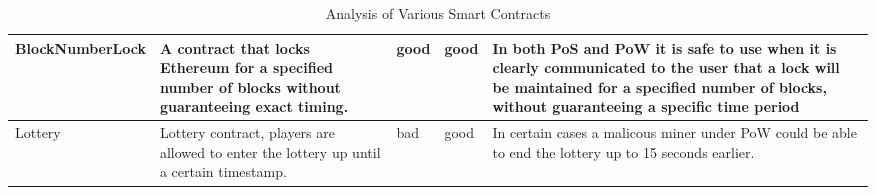 \begin{table}[H]
\begin{tabularx}{\textwidth}{L{3.5cm}L{3.5cm}C{0.5cm}C{0.5cm}X}
BlockNumberLock       & A contract that locks Ethereum for a specified number of blocks without guaranteeing exact timing.                                      & good         & good         & In both PoS and PoW it is safe to use when it is clearly communicated to the user that a lock will be maintained for a specified number of blocks, without guaranteeing a specific time period \\ \hline
Lottery               & Lottery contract, players are allowed to enter the lottery up until a certain timestamp.                                                               & bad         & good         & In certain cases a malicous miner under PoW could be able to end the lottery up to 15 seconds earlier.


\end{tabularx}
\caption{Analysis of Various Smart Contracts}
\label{tab:smart_contracts}
\end{table}
%
%
%
%
%
%
%


